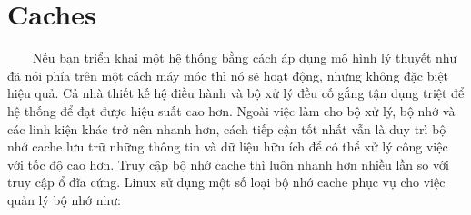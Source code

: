 \documentclass{article}
\begin{document}
\section{Caches}

~~~~Nếu bạn triển khai một hệ thống bằng cách áp dụng mô hình lý thuyết như đã nói phía trên một cách máy móc thì nó sẽ hoạt động, nhưng không đặc biệt hiệu quả. Cả nhà thiết kế hệ điều hành và bộ xử lý đều cố gắng tận dụng triệt để hệ thống để đạt được hiệu suất cao hơn. Ngoài việc làm cho bộ xử lý, bộ nhớ và các linh kiện khác trở nên nhanh hơn, cách tiếp cận tốt nhất vẫn là duy trì bộ nhớ cache lưu trữ những thông tin và dữ liệu hữu ích để có thể xử lý công việc với tốc độ cao hơn. Truy cập bộ nhớ cache thì luôn nhanh hơn nhiều lần so với truy cập ổ đĩa cứng. Linux sử dụng một số loại bộ nhớ cache phục vụ cho việc quản lý bộ nhớ như:
\end{document}
